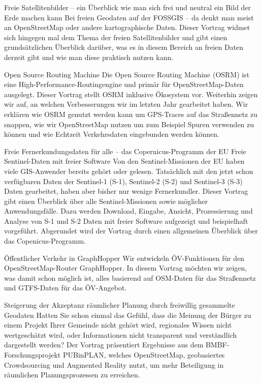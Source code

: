 \renewcommand{\konferenztag}{\montag}
%
{Freie Satellitenbilder – ein Überblick}%
{wie man sich frei und neutral ein Bild der Erde machen kann}%
{Bei freien Geodaten auf der FOSSGIS -- da denkt man meist an OpenStreetMap oder andere
kartographische Daten. Dieser Vortrag widmet sich hingegen mal dem Thema der freien Satellitenbilder
und gibt einen grundsätzlichen Überblick darüber, was es in diesem Bereich an freien Daten derzeit
gibt und wie man diese praktisch nutzen kann.}


%
{Open Source Routing Machine}%
{}
{Die Open Source Routing Machine (OSRM) ist eine High-Performance-Routingengine und primär für
  OpenStreetMap-Daten ausgelegt. Dieser Vortrag stellt OSRM inklusive Ökosystem vor. Weiterhin
  zeigen wir auf, an welchen Verbesserungen wir im letzten Jahr gearbeitet haben. Wir erklären wie
  OSRM genutzt werden kann um GPS-Traces auf das Straßennetz zu snappen, wie wir OpenStreetMap
  nutzen um zum Beispiel Spuren verwenden zu können und wie Echtzeit Verkehrsdaten eingebunden
werden können.}

%
{Freie Fernerkundungsdaten für alle – das Copernicus-Programm der EU}%
{Freie Sentinel-Daten mit freier Software}%
{Von den Sentinel-Missionen der EU haben viele GIS-Anwender bereits gehört oder gelesen. Tatsächlich
mit den jetzt schon verfügbaren Daten der Sentinel-1 (S-1), Sentinel-2 (S-2) und Sentinel-3 (S-3)
Daten gearbeitet, haben aber bisher nur wenige Fernerkundler. Dieser Vortrag gibt einen Überblick
über alle Sentinel-Missionen sowie möglicher Anwendungsfälle. Dazu werden Download, Eingabe,
Ansicht, Prozessierung und Analyse von S-1 und S-2 Daten mit freier Software aufgezeigt und
beispielhaft vorgeführt. Abgerundet wird der Vortrag durch einen allgemeinen Überblick über das
Copenicus-Programm.}



%
{Öffentlicher Verkehr in GraphHopper}%
{}%
{Wir entwickeln ÖV-Funktionen für den OpenStreetMap-Router GraphHopper. In diesem Vortrag möchten
wir zeigen, was damit schon möglich ist, alles basierend auf OSM-Daten für das Straßennetz und
GTFS-Daten für das ÖV-Angebot.}

%
{Steigerung der Akzeptanz räumlicher Planung durch freiwillig gesammelte Geodaten}%
{}%
{Hatten Sie schon einmal das Gefühl, dass die Meinung der Bürger zu einem Projekt Ihrer Gemeinde
nicht gehört wird, regionales Wissen nicht wertgeschätzt wird, oder Informationen nicht transparent
und verständlich dargestellt werden? Der Vortrag präsentiert Ergebnisse aus dem
BMBF-Forschungsprojekt PUBinPLAN, welches OpenStreetMap, geobasiertes Crowdsourcing und Augmented
Reality nutzt, um mehr Beteiligung in räumlichen Planungsprozessen zu erreichen. }

